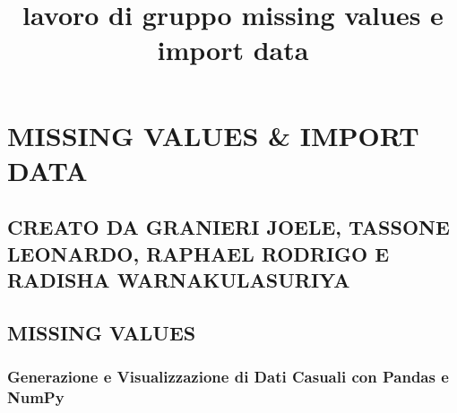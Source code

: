 \documentclass[11pt]{article}
\title{lavoro di gruppo missing values e import data }
\begin{document}
    
    \maketitle
    
    

    
    \section{MISSING VALUES \& IMPORT
DATA}\label{missing-values-import-data}

    \subsection{CREATO DA GRANIERI JOELE, TASSONE LEONARDO, RAPHAEL RODRIGO
E RADISHA
WARNAKULASURIYA}\label{creato-da-granieri-joele-tassone-leonardo-raphael-rodrigo-e-radisha-warnakulasuriya}

    \subsection{MISSING VALUES}\label{missing-values}

    \subsubsection{Generazione e Visualizzazione di Dati Casuali con Pandas
e
NumPy}\label{generazione-e-visualizzazione-di-dati-casuali-con-pandas-e-numpy}
\end{document}
